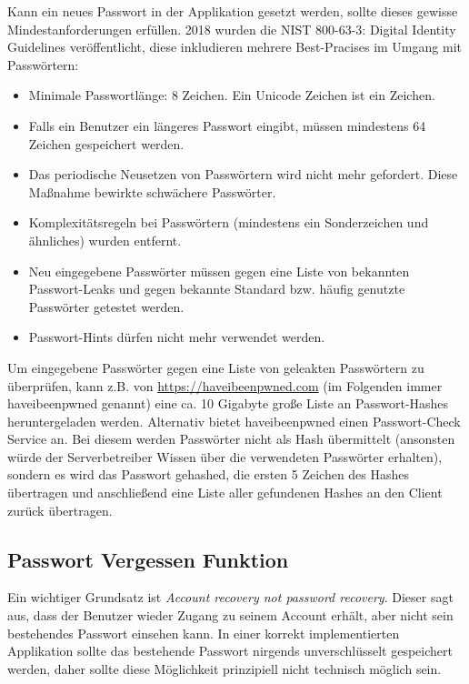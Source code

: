 Kann ein neues Passwort in der Applikation gesetzt werden, sollte dieses gewisse Mindestanforderungen erfüllen. 2018 wurden die NIST 800-63-3: Digital Identity Guidelines veröffentlicht, diese inkludieren mehrere Best-Pracises im Umgang mit Passwörtern:

\begin{itemize}
	\item Minimale Passwortlänge: 8 Zeichen. Ein Unicode Zeichen ist ein Zeichen.
	\item Falls ein Benutzer ein längeres Passwort eingibt, müssen mindestens 64 Zeichen gespeichert werden.
	\item Das periodische Neusetzen von Passwörtern wird nicht mehr gefordert. Diese Maßnahme bewirkte schwächere Passwörter.
	\item Komplexitätsregeln bei Passwörtern (mindestens ein Sonderzeichen und ähnliches) wurden entfernt.
	\item Neu eingegebene Passwörter müssen gegen eine Liste von bekannten Passwort-Leaks und gegen bekannte Standard bzw. häufig genutzte Passwörter getestet werden.
	\item Passwort-Hints dürfen nicht mehr verwendet werden.
\end{itemize}

Um eingegebene Passwörter gegen eine Liste von geleakten Passwörtern zu überprüfen, kann z.B. von \url{https://haveibeenpwned.com} (im Folgenden immer haveibeenpwned genannt) eine ca. 10 Gigabyte große Liste an Passwort-Hashes heruntergeladen werden. Alternativ bietet haveibeenpwned einen Passwort-Check Service an. Bei diesem werden Passwörter nicht als Hash übermittelt (ansonsten würde der Serverbetreiber Wissen über die verwendeten Passwörter erhalten), sondern es wird das Passwort gehashed, die ersten 5 Zeichen des Hashes übertragen und anschließend eine Liste aller gefundenen Hashes an den Client zurück übertragen.

\subsection{Passwort Vergessen Funktion}

Ein wichtiger Grundsatz ist \textit{Account recovery not password recovery}. Dieser sagt aus, dass der Benutzer wieder Zugang zu seinem Account erhält, aber nicht sein bestehendes Passwort einsehen kann. In einer korrekt implementierten Applikation sollte das bestehende Passwort nirgends unverschlüsselt gespeichert werden, daher sollte diese Möglichkeit prinzipiell nicht technisch möglich sein.

